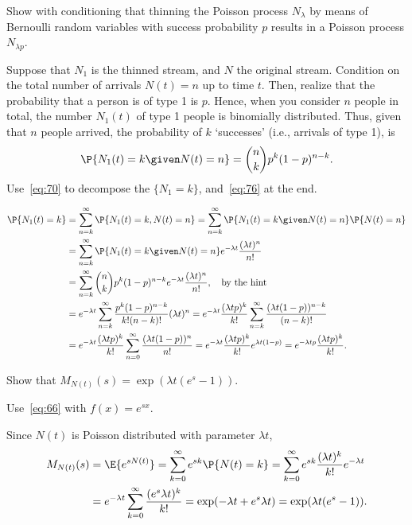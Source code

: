 \begin{exercise}\label{ex:32}
 Show with conditioning that thinning the Poisson process $N_\lambda$ by means of Bernoulli random variables with success probability $p$ results in a Poisson process $N_{\lambda p}$.
\begin{hint}
Suppose that $N_1$ is the thinned stream, and $N$ the original stream. Condition on the total number of arrivals $N(t)=n$ up to time
 $t$. Then, realize that the probability that a person is of type 1 is $p$. Hence, when you consider $n$ people in
 total, the number $N_1(t)$ of type 1 people is binomially distributed. Thus, given that $n$ people arrived, the probability of $k$ `successes' (i.e., arrivals of type 1), is
 \begin{equation*}
 \P{N_1(t)=k \given N(t) = n} = {n \choose k} p^k (1-p)^{n-k}.
 \end{equation*}
Use~\cref{eq:70} to decompose the $\{N_1=k\}$, and~\cref{eq:76} at the end.
\end{hint}
\begin{solution}
\begin{align*}
 \P{N_1(t) = k}
&= \sum_{n=k}^\infty \P{N_1(t) =k, N(t) = n}
= \sum_{n=k}^\infty \P{N_1(t) =k\given N(t) = n}\P{N(t)=n} \\
&= \sum_{n=k}^\infty \P{N_1(t) =k\given N(t) = n}e^{-\lambda t} \frac{(\lambda t)^n}{n!}\\
&= \sum_{n=k}^\infty {n \choose k} p^k (1-p)^{n-k} e^{-\lambda t} \frac{(\lambda t)^n}{n!}, \quad\text{by the hint}\\
&= e^{-\lambda t}\sum_{n=k}^\infty \frac{p^k (1-p)^{n-k}}{k! (n-k)!} (\lambda t)^n
= e^{-\lambda t} \frac{(\lambda t p)^k}{k!} \sum_{n=k}^\infty \frac{(\lambda t (1-p))^{n-k}}{(n-k)!}\\
&= e^{-\lambda t} \frac{(\lambda t p)^k}{k!} \sum_{n=0}^\infty \frac{(\lambda t (1-p))^{n}}{n!}
= e^{-\lambda t} \frac{(\lambda t p)^k}{k!} e^{\lambda t(1-p)} = e^{-\lambda t p} \frac{(\lambda t p)^k}{k!}.
\end{align*}
\end{solution}
\end{exercise}


\begin{exercise} \label{ex:53}
Show that $M_{N(t)}(s) = \exp{(\lambda t(e^s-1))}$.
\begin{hint}
Use~\cref{eq:66} with $f(x) = e^{sx}$.
\end{hint}
\begin{solution}
Since $N(t)$ is Poisson distributed with parameter $\lambda t$,
\begin{align*}
M_{N(t)}(s)
&= \E{e^{s N(t)}}
= \sum_{k=0}^\infty e^{s k} \P{N(t)=k}
= \sum_{k=0}^\infty e^{s k} \frac{(\lambda t)^k}{k!} e^{-\lambda t} \\
&= e^{-\lambda t} \sum_{k=0}^\infty \frac{(e^s \lambda t)^k}{k!}
= \exp(-\lambda t + e^s \lambda t) =\exp(\lambda t(e^s - 1)).
\end{align*}
\end{solution}
\end{exercise}


